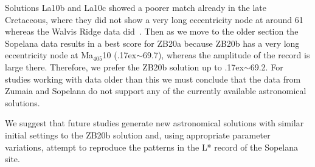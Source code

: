 \documentclass[draft]{agujournal2019}
\newcommand{\appr}{\raise.17ex\hbox{\(\scriptstyle\sim\)}} %
\newcommand{\ma}[1]{Ma\(_{405}\)#1} %
\begin{document}
Solutions La10b and La10c showed a poorer match already in the late Cretaceous, where they did not show a very long eccentricity node at around \qty{61}{\millionyearago} whereas the Walvis Ridge data did~\cite{ZeebeLourens2022EPSL}.
Then as we move to the older section the Sopelana data results in a best score for ZB20a because ZB20b has a very long eccentricity node at \ma{10} (\appr\qty{69.7}{\millionyearago}), whereas the amplitude of the record is large there.
Therefore, we prefer the ZB20b solution up to \appr\qty{69.2}{\millionyearago}.
For studies working with data older than this we must conclude that the data from Zumaia and Sopelana do not support any of the currently available astronomical solutions.

We suggest that future studies generate new astronomical solutions with similar initial settings to the ZB20b solution and, using appropriate parameter variations, attempt to reproduce the patterns in the \gls{L*} record of the Sopelana site.









%
%
%
%
%
%
%
%
%
%
\end{document}
